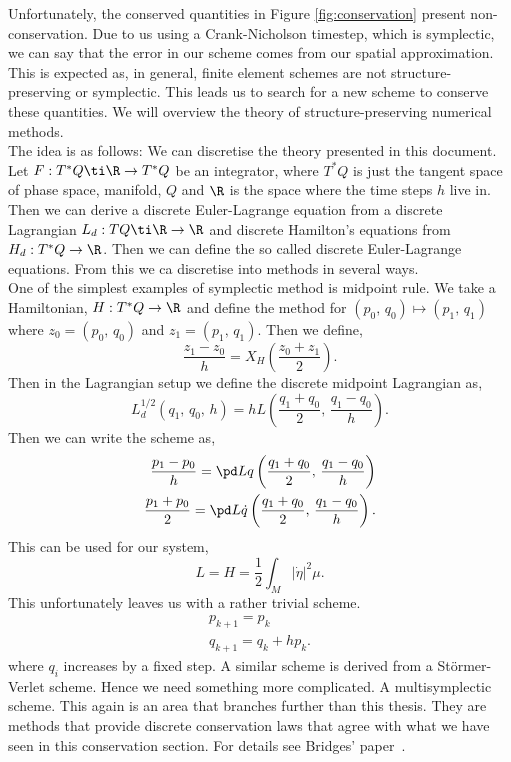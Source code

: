 \newpage
\noindent
Unfortunately, the conserved quantities in Figure \ref{fig:conservation} present non-conservation. Due to us using a Crank-Nicholson timestep, which is symplectic, we can say that the error in our scheme comes from our spatial approximation. This is expected as, in general, finite element schemes are not structure-preserving or symplectic. This leads us to search for a new scheme to conserve these quantities. We will overview the theory of structure-preserving numerical methods. \\

\noindent
The idea is as follows: We can discretise the theory presented in this document. Let $F : T^*Q \ti \R \to T^*Q$ be an integrator, where $T^*Q$ is just the tangent space of phase space, manifold, $Q$ and $\R$ is the space where the time steps $h$ live in. Then we can derive a discrete Euler-Lagrange equation from a discrete Lagrangian $L_d : TQ \ti \R \to \R$ and discrete Hamilton's equations from $H_d : T^*Q\to \R$. Then we can define the so called discrete Euler-Lagrange equations. From this we ca discretise into methods in several ways.\\

\noindent
One of the simplest examples of symplectic method is midpoint rule. We take a Hamiltonian, $H : T^*Q \to \R$ and define the method for $(p_0,\,q_0) \mapsto (p_1,\,q_1)$ where $z_0 = (p_0,\,q_0)$ and $z_1 = (p_1,\,q_1)$. Then we define,
$$ \frac{z_1-z_0}{h} = X_H \left( \frac{z_0 + z_1}{2} \right). $$
Then in the Lagrangian setup we define the discrete midpoint Lagrangian as,
$$ L_d^{1/2} (q_1,\,q_0,\, h) = hL\left(\frac{q_1 + q_0}{2},\, \frac{q_1 - q_0}{h}\right). $$
Then we can write the scheme as,
\begin{align*}
  \frac{p_1 - p_0}{h} = \pd L {q} \left(\frac{q_1 + q_0}{2},\, \frac{q_1 - q_0}{h}\right) \\
  \frac{p_1 + p_0}{2} = \pd L {\dot q}\left(\frac{q_1 + q_0}{2},\, \frac{q_1 - q_0}{h}\right).
\end{align*}
\noindent
This can be used for our system,
$$ L = H = \frac{1}{2}\int_M |\dot \eta|^2 \mu. $$
This unfortunately leaves us with a rather trivial scheme.
\begin{align*}
  p_{k+1} = p_k \\
  q_{k+1} = q_k + hp_k.
\end{align*}
where $q_i$ increases by a fixed step. A similar scheme is derived from a St\"ormer-Verlet scheme. Hence we need something more complicated. A multisymplectic scheme. This again is an area that branches further than this thesis. They are methods that provide discrete conservation laws that agree with what we have seen in this conservation section. For details see Bridges' paper~\cite{hamil_pdes}.

